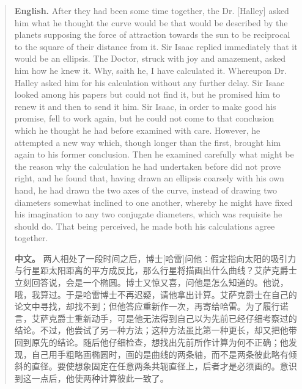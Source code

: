 \begin{quote}
\noindent\textbf{English.} After they had been some time together, the Dr. [Halley] asked him what he thought the curve would be that would be described by the planets supposing the force of attraction towards the sun to be reciprocal to the square of their distance from it. Sir Isaac replied immediately that it would be an ellipsis. The Doctor, struck with joy and amazement, asked him how he knew it. Why, saith he, I have calculated it. Whereupon Dr. Halley asked him for his calculation without any further delay. Sir Isaac looked among his papers but could not find it, but he promised him to renew it and then to send it him. Sir Isaac, in order to make good his promise, fell to work again, but he could not come to that conclusion which he thought he had before examined with care. However, he attempted a new way which, though longer than the first, brought him again to his former conclusion. Then he examined carefully what might be the reason why the calculation he had undertaken before did not prove right, and he found that, having drawn an ellipsis coarsely with his own hand, he had drawn the two axes of the curve, instead of drawing two diameters somewhat inclined to one another, whereby he might have fixed his imagination to any two conjugate diameters, which was requisite he should do. That being perceived, he made both his calculations agree together.
\par\noindent\textbf{中文。} 两人相处了一段时间之后，博士[哈雷]问他：假定指向太阳的吸引力与行星距太阳距离的平方成反比，那么行星将描画出什么曲线？艾萨克爵士立刻回答说，会是一个椭圆。博士又惊又喜，问他是怎么知道的。他说，哦，我算过。于是哈雷博士不再迟疑，请他拿出计算。艾萨克爵士在自己的论文中寻找，却找不到；但他答应重新作一次，再寄给哈雷。为了履行诺言，艾萨克爵士重新动手，可是他无法得到自己以为先前已经仔细考察过的结论。不过，他尝试了另一种方法；这种方法虽比第一种更长，却又把他带回到原先的结论。随后他仔细检查，想找出先前所作计算为何不正确；他发现，自己用手粗略画椭圆时，画的是曲线的两条轴，而不是两条彼此略有倾斜的直径。要使想象固定在任意两条共轭直径上，后者才是必须画的。意识到这一点后，他使两种计算彼此一致了。
\end{quote}

